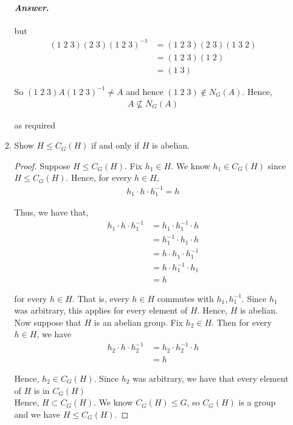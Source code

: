 \documentclass[11pt, reqno]{amsart}
\theoremstyle{plain}
\theoremstyle{definition}
\theoremstyle{example}
\newenvironment{ans}{\color{black}\medskip \paragraph*{\emph{Answer}.}}{\hfill \break  $~\!\!$ \dotfill \medskip }
\begin{document}
\begin{enumerate}[1.]
\begin{enumerate}
\begin{ans}
but 
\begin{align*}
(1 \; 2 \; 3)(2 \; 3)(1 \; 2 \; 3)^{-1} &= (1 \; 2 \; 3)(2 \; 3)(1 \; 3 \; 2)\\
&= (1 \; 2 \; 3)(1 \; 2)\\
&= (1 \; 3)
\end{align*}

So $(1 \; 2 \; 3)A(1 \; 2 \; 3)^{-1} \neq A$ and hence $(1 \; 2 \; 3) \not\in N_G(A)$. Hence,
\begin{align*}
A \not\subseteq N_G(A)
\end{align*}

as required
\end{ans}

\item Show $H \leq C_G(H)$ if and only if $H$ is abelian.
\begin{proof}
Suppose $H \leq C_G(H)$. Fix $h_1 \in H$. We know $h_1 \in C_G(H)$ since $H \leq C_G(H)$. Hence, for every $h \in H$,
\begin{align*}
h_1 \cdot h \cdot h_1^{-1} = h
\end{align*}

Thus, we have that,
\begin{align*}
h_1 \cdot h \cdot h_1^{-1} &= h_1 \cdot h_1^{-1} \cdot h\\
&= h_1^{-1} \cdot h_1 \cdot h\\
&= h \cdot h_1 \cdot h_1^{-1}\\
&= h \cdot h_1^{-1} \cdot h_1\\
&= h
\end{align*}

for every $h \in H$. That is, every $h \in H$ commutes with $h_1, h_1^{-1}$. Since $h_1$ was arbitrary, this applies for every element of $H$. Hence, $H$ is abelian.\\

Now suppose that $H$ is an abelian group. Fix $h_2 \in H$. Then for every $h \in H$, we have
\begin{align*}
h_2 \cdot h \cdot h_2^{-1} &= h_2 \cdot h_2^{-1} \cdot h\\
&= h
\end{align*}

Hence, $h_2 \in C_G(H)$. Since $h_2$ was arbitrary, we have that every element of $H$ is in $C_G(H)$\\

Hence, $H \subset C_G(H)$. We know $C_G(H) \leqslant G$, so $C_G(H)$ is a group and we have $H \leqslant C_G(H)$.
\end{proof}


\end{enumerate}
\end{enumerate}
\end{document}

